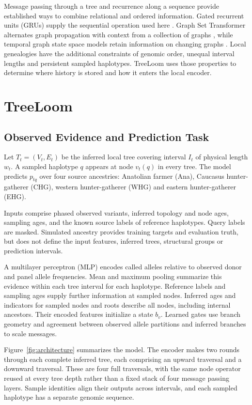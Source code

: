 \documentclass[letterpaper]{article}
\begin{document}
Message passing through a tree and recurrence along a sequence provide established ways to combine relational and ordered information. Gated recurrent units (GRUs) supply the sequential operation used here \citep{gru2014}. Graph Set Transformer alternates graph propagation with context from a collection of graphs \citep{gst2026}, while temporal graph state space models retain information on changing graphs \citep{graphssm2024}. Local genealogies have the additional constraints of genomic order, unequal interval lengths and persistent sampled haplotypes. TreeLoom uses those properties to determine where history is stored and how it enters the local encoder.

\section{TreeLoom}
\subsection{Observed Evidence and Prediction Task}
Let $T_t=(V_t,E_t)$ be the inferred local tree covering interval $I_t$ of physical length $w_t$. A sampled haplotype $q$ appears at node $v_t(q)$ in every tree. The model predicts $p_{tq}$ over four source ancestries: Anatolian farmer (Ana), Caucasus hunter-gatherer (CHG), western hunter-gatherer (WHG) and eastern hunter-gatherer (EHG).

Inputs comprise phased observed variants, inferred topology and node ages, sampling ages, and the known source labels of reference haplotypes. Query labels are masked. Simulated ancestry provides training targets and evaluation truth, but does not define the input features, inferred trees, structural groups or prediction intervals.

A multilayer perceptron (MLP) encodes called alleles relative to observed donor and panel allele frequencies. Mean and maximum pooling summarize this evidence within each tree interval for each haplotype. Reference labels and sampling ages supply further information at sampled nodes. Inferred ages and indicators for sampled nodes and roots describe all nodes, including internal ancestors. Their encoded features initialize a state $b_v$. Learned gates use branch geometry and agreement between observed allele partitions and inferred branches to scale messages.

Figure~\ref{fig:architecture} summarizes the model. The encoder makes two rounds through each complete inferred tree, each comprising an upward traversal and a downward traversal. These are four full traversals, with the same node operator reused at every tree depth rather than a fixed stack of four message passing layers. Sample identities align their outputs across intervals, and each sampled haplotype has a separate genomic sequence.
\end{document}
